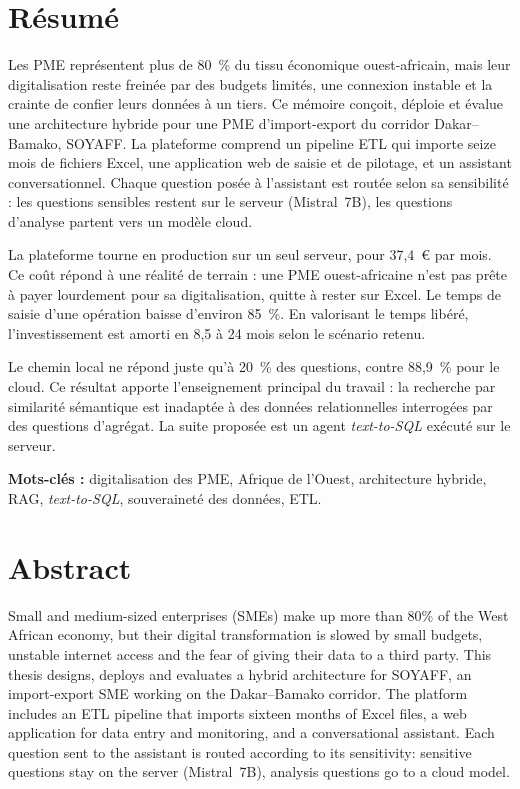 \chapter*{Résumé}
\label{chap:resume}

Les PME représentent plus de 80~\% du tissu économique ouest-africain, mais leur digitalisation reste freinée par des budgets limités, une connexion instable et la crainte de confier leurs données à un tiers. Ce mémoire conçoit, déploie et évalue une architecture hybride pour une PME d'import-export du corridor Dakar--Bamako, SOYAFF. La plateforme comprend un pipeline ETL qui importe seize mois de fichiers Excel, une application web de saisie et de pilotage, et un assistant conversationnel. Chaque question posée à l'assistant est routée selon sa sensibilité : les questions sensibles restent sur le serveur (Mistral~7B), les questions d'analyse partent vers un modèle cloud.

La plateforme tourne en production sur un seul serveur, pour 37,4~€ par mois. Ce coût répond à une réalité de terrain : une PME ouest-africaine n'est pas prête à payer lourdement pour sa digitalisation, quitte à rester sur Excel. Le temps de saisie d'une opération baisse d'environ 85~\%. En valorisant le temps libéré, l'investissement est amorti en 8,5 à 24 mois selon le scénario retenu.

Le chemin local ne répond juste qu'à 20~\% des questions, contre 88,9~\% pour le cloud. Ce résultat apporte l'enseignement principal du travail : la recherche par similarité sémantique est inadaptée à des données relationnelles interrogées par des questions d'agrégat. La suite proposée est un agent \textit{text-to-SQL} exécuté sur le serveur.

\medskip
\noindent\textbf{Mots-clés :} digitalisation des PME, Afrique de l'Ouest, architecture hybride, RAG, \textit{text-to-SQL}, souveraineté des données, ETL.

\chapter*{Abstract}
\label{chap:abstract}

Small and medium-sized enterprises (SMEs) make up more than 80\% of the West African economy, but their digital transformation is slowed by small budgets, unstable internet access and the fear of giving their data to a third party. This thesis designs, deploys and evaluates a hybrid architecture for SOYAFF, an import-export SME working on the Dakar--Bamako corridor. The platform includes an ETL pipeline that imports sixteen months of Excel files, a web application for data entry and monitoring, and a conversational assistant. Each question sent to the assistant is routed according to its sensitivity: sensitive questions stay on the server (Mistral~7B), analysis questions go to a cloud model.

